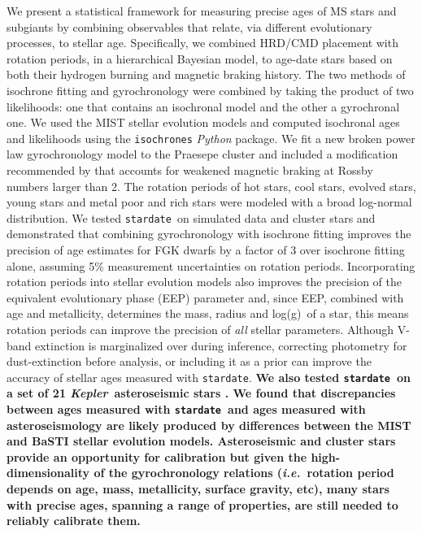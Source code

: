 \documentclass[useAMS, usenatbib, preprint, 12pt]{aastex}
\newcommand{\ie}{{\it i.e.}}
\newcommand{\kepler}{{\it Kepler}}
\newcommand{\logg}{log(g)}
\newcommand{\sd}{{\tt stardate}}
\newcommand{\racomment}[1]{{\bf #1}}
\begin{document}
We present a statistical framework for measuring precise ages of MS stars and
subgiants by combining observables that relate, via different evolutionary
processes, to stellar age.
Specifically, we combined HRD/CMD placement with rotation periods, in a
hierarchical Bayesian model, to age-date stars based on both their hydrogen
burning and magnetic braking history.
The two methods of isochrone fitting and gyrochronology were combined by
taking the product of two likelihoods: one that contains an isochronal model
and the other a gyrochronal one.
We used the MIST stellar evolution models and computed isochronal ages and
likelihoods using the {\tt isochrones} {\it Python} package.
We fit a new broken power law gyrochronology model to the Praesepe cluster
and included a modification recommended by \citet{vansaders2016} that accounts
for weakened magnetic braking at Rossby numbers larger than 2.
The rotation periods of hot stars, cool stars, evolved stars, young stars and
metal poor and rich stars were modeled with a broad log-normal distribution.
We tested \sd\ on simulated data and cluster stars and demonstrated that
combining gyrochronology with isochrone fitting improves the precision of age
estimates for FGK dwarfs by a factor of 3 over isochrone fitting alone,
assuming 5\% measurement uncertainties on rotation periods.
Incorporating rotation periods into stellar evolution models also improves the
precision of the equivalent evolutionary phase (EEP) parameter and, since EEP,
combined with age and metallicity, determines the mass, radius and \logg\ of a
star, this means rotation periods can improve the precision of {\it all}
stellar parameters.
Although V-band extinction is marginalized over during inference, correcting
photometry for dust-extinction before analysis, or including it as a
prior can improve the accuracy of stellar ages measured with \sd.
\racomment{
We also tested \sd\ on a set of 21 \kepler\ asteroseismic stars
\citep{vansaders2016}.
We found that discrepancies between ages measured with \sd\ and ages measured
with asteroseismology are likely produced by differences between the MIST and
BaSTI stellar evolution models.
Asteroseismic and cluster stars provide an opportunity for calibration but
given the high-dimensionality of the gyrochronology relations (\ie\ rotation
period depends on age, mass, metallicity, surface gravity, etc), many stars
with precise ages, spanning a range of properties, are still needed to
reliably calibrate them.
}
\end{document}
